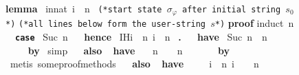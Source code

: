 \documentclass[10pt,conference]{IEEEtran}
\newcommand{\isakwprf}[1]{\textcolor{IsaLightBlue}{\textbf{\texttt{#1}}}}
\newcommand{\isacmt}[1]{\textcolor{IsaDarkRed}{\texttt{#1}}}
\newcommand{\isakw}[1]{{\bfseries\ttfamily\def\isachardot{.}\def\isacharunderscore{\isacharunderscorekeyword}%
\def\isacharbraceleft{\{}\def\isacharbraceright{\}}#1}}
\renewcommand{\isacommand}[1]{\textcolor{IsaBlue}{\isakw{#1}}}
\begin{document}
\begin{figure}
\begin{isabellebody}
\isacommand{lemma}\isamarkupfalse%
\ {\isachardoublequoteopen}{\isacharparenleft}{\kern0pt}{\isasymSum}i{\isasymle}{\isacharparenleft}{\kern0pt}n{\isacharcolon}{\kern0pt}{\isacharcolon}{\kern0pt}nat{\isacharparenright}{\kern0pt}{\isachardot}{\kern0pt}\ {}{\isacharasterisk}{\kern0pt}i{\isacharminus}{\kern0pt}{}{\isacharparenright}{\kern0pt}\ {\isacharequal}{\kern0pt}\ n\ \isanewline
\isacmt{(*start state $\sigma_\varphi$ after initial string $s_0$*)}\isanewline
\isacmt{(*all lines below form the user-string $s$*)}\isanewline
\isacommand{proof}\isamarkupfalse%
{\isacharparenleft}{\kern0pt}induct\ n{\isacharparenright}{\kern0pt}\isanewline
\ \ \isakwprf{case}\isamarkupfalse%
\ {\isacharparenleft}{\kern0pt}Suc\ n{\isacharparenright}{\kern0pt}\isanewline
\ \ \isacommand{hence}\isamarkupfalse%
\ IH{\isacharcolon}{\kern0pt}{\isachardoublequoteopen}{\isacharparenleft}{\kern0pt}{\isasymSum}i\ {\isasymle}\ n{\isachardot}{\kern0pt}\ {}{\isacharasterisk}{\kern0pt}i{\isacharminus}{\kern0pt}{}{\isacharparenright}{\kern0pt}\ {\isacharequal}{\kern0pt}\ n\ \isacommand{{\isachardot}{\kern0pt}}\isamarkupfalse%
\isanewline
\ \ \isacommand{have}\isamarkupfalse%
\ {\isachardoublequoteopen}{\isacharparenleft}{\kern0pt}Suc\ n{\isacharparenright}{\kern0pt}\ {\isacharequal}{\kern0pt}\ {\isacharparenleft}{\kern0pt}n\ {\isacharplus}{\kern0pt}\ {}{\isacharparenright}{\kern0pt}\isanewline
\ \ \ \ \isacommand{by}\isamarkupfalse%
\ simp\isanewline
\ \ \isacommand{also}\isamarkupfalse%
\ \isacommand{have}\isamarkupfalse%
\ {\isachardoublequoteopen}{\isachardot}{\kern0pt}{\isachardot}{\kern0pt}{\isachardot}{\kern0pt}\ {\isacharequal}{\kern0pt}\ n\ {\isacharplus}{\kern0pt}\ {}\ {\isacharasterisk}{\kern0pt}\ n\ {\isacharplus}{\kern0pt}\ {}{\isachardoublequoteclose}\isanewline
\ \ \ \ \isacommand{by}\isamarkupfalse%
\ {\isacharparenleft}{\kern0pt}metis\ some{\isacharunderscore}proof{\isacharunderscore}methods{\isacharparenright}{\kern0pt}\isanewline
\ \ \isacommand{also}\isamarkupfalse%
\ \isacommand{have}\isamarkupfalse%
\ {\isachardoublequoteopen}{\isachardot}{\kern0pt}{\isachardot}{\kern0pt}{\isachardot}{\kern0pt}\ {\isacharequal}{\kern0pt}\isanewline
\ \ {\isacharparenleft}{\kern0pt}{\isasymSum}i\ {\isasymle}\ n{\isachardot}{\kern0pt}\ {}{\isacharasterisk}{\kern0pt}i{\isacharminus}{\kern0pt}{}{\isacharparenright}{\kern0pt}\ {\isacharplus}{\kern0pt}\ {}\ {\isacharasterisk}{\kern0pt}\ n\ {\isacharplus}{\kern0pt}\ {}{\isachardoublequoteclose}\isanewline

\end{isabellebody}
\end{figure}
\end{document}
